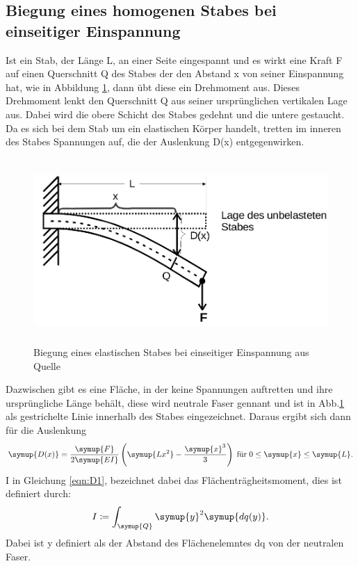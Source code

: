 \subsection{Biegung eines homogenen Stabes bei einseitiger Einspannung}
\label{sec:T1}
Ist ein Stab, der Länge L, an einer Seite eingespannt und es wirkt eine Kraft F
auf einen
Querschnitt Q des Stabes der den Abstand x von seiner Einspannung hat, wie in
Abbildung \ref{fig:abb2}, dann übt diese ein Drehmoment aus. Dieses Drehmoment
lenkt den Querschnitt Q aus seiner ursprünglichen vertikalen Lage aus. Dabei
wird die obere Schicht des Stabes gedehnt und die untere gestaucht. Da es sich
bei dem Stab um ein elastischen Körper handelt, tretten im inneren des Stabes
Spannungen auf, die der Auslenkung D(x) entgegenwirken.
\begin{figure}
  \centering
  \includegraphics[height = 7cm]{logos/Abb2.png}
  \caption{Biegung eines elastischen Stabes bei einseitiger Einspannung
  aus Quelle \cite{sample}}
  \label{fig:abb2}
\end{figure}
\FloatBarrier
Dazwischen gibt es eine Fläche, in der keine Spannungen auftretten und ihre
ursprüngliche Länge behält, diese wird neutrale Faser gennant und ist in
Abb.\ref{fig:abb2} als gestrichelte Linie innerhalb des Stabes eingezeichnet.
Daraus ergibt sich dann für die Auslenkung
\begin{equation}
  \symup{D(x)} = \frac{\symup{F}}{2\symup{EI}} \left(\symup{Lx^2}-
  \frac{\symup{x}^3}{3}\right) \; \text{für} \; 0 \leq \symup{x} \leq \symup{L}.
  \label{eqn:D1}
\end{equation}
I in Gleichung \eqref{eqn:D1}, bezeichnet dabei das Flächenträgheitsmoment, dies
ist definiert durch:
\begin{equation}
  I \coloneq \int_{\symup{Q}}\symup{y}^2\symup{dq(y)}.
  \label{eqn:I}
\end{equation}
Dabei ist y definiert als der Abstand des Flächenelemntes dq von der neutralen
Faser.
